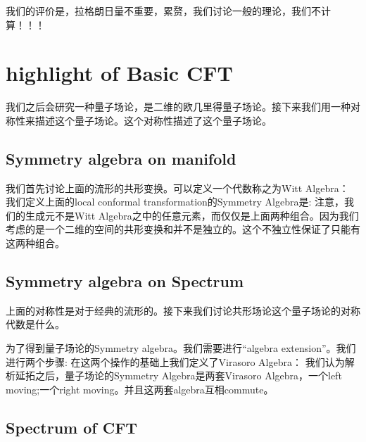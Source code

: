 我们的评价是，拉格朗日量不重要，累赘，我们讨论一般的理论，我们不计算！！！


\newpage
\section{highlight of Basic CFT}

我们之后会研究一种量子场论，是二维的欧几里得量子场论。接下来我们用一种对称性来描述这个量子场论。这个对称性描述了这个量子场论。

\subsection{Symmetry algebra on manifold}
我们首先讨论上面的流形的共形变换。可以定义一个代数称之为Witt Algebra：
我们定义上面的local conformal transformation的Symmetry Algebra是:
注意，我们的生成元不是Witt Algebra之中的任意元素，而仅仅是上面两种组合。因为我们考虑的是一个二维的空间的共形变换和并不是独立的。这个不独立性保证了只能有这两种组合。

\subsection{Symmetry algebra on Spectrum}
上面的对称性是对于经典的流形的。接下来我们讨论共形场论这个量子场论的对称代数是什么。

为了得到量子场论的Symmetry algebra。我们需要进行“algebra extension”。我们进行两个步骤:
在这两个操作的基础上我们定义了Virasoro Algebra：
我们认为解析延拓之后，量子场论的Symmetry Algebra是两套Virasoro Algebra，一个left moving;一个right moving。并且这两套algebra互相commute。


\subsection{Spectrum of CFT}


